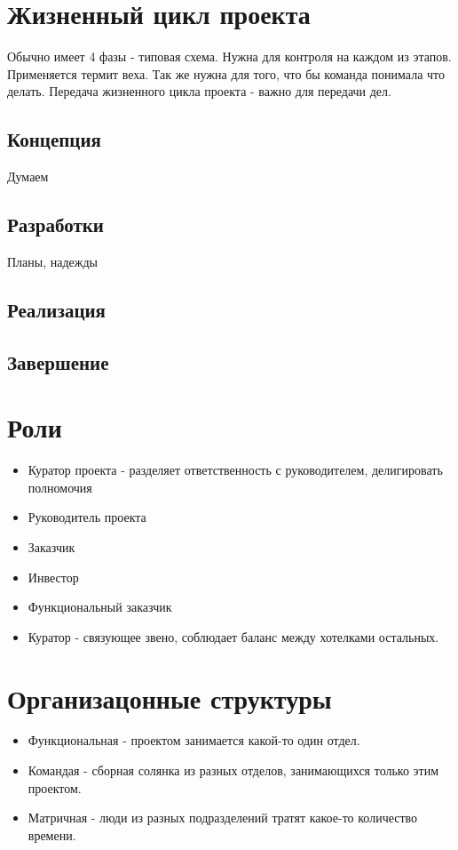 \section{Жизненный цикл проекта}

Обычно имеет 4 фазы - типовая схема. Нужна для контроля на каждом из этапов. Применяется термит веха. Так же нужна для того, что бы команда понимала что делать. Передача жизненного цикла проекта - важно для передачи дел.

\subsection{Концепция}
Думаем
\subsection{Разработки}
Планы, надежды
\subsection{Реализация}
\subsection{Завершение}

\section{Роли}

\begin{itemize}
\item Куратор проекта - разделяет ответственность с руководителем, делигировать полномочия
\item Руководитель проекта
\item Заказчик
\item Инвестор
\item Функциональный заказчик
\item Куратор - связующее звено, соблюдает баланс между хотелками остальных.
\end{itemize}

\section{Организацонные структуры}

\begin{itemize}
\item Функциональная - проектом занимается какой-то один отдел.
\item Командая - сборная  солянка из разных отделов, занимающихся только этим проектом.
\item Матричная - люди из разных подразделений тратят какое-то количество времени.
\end{itemize}

